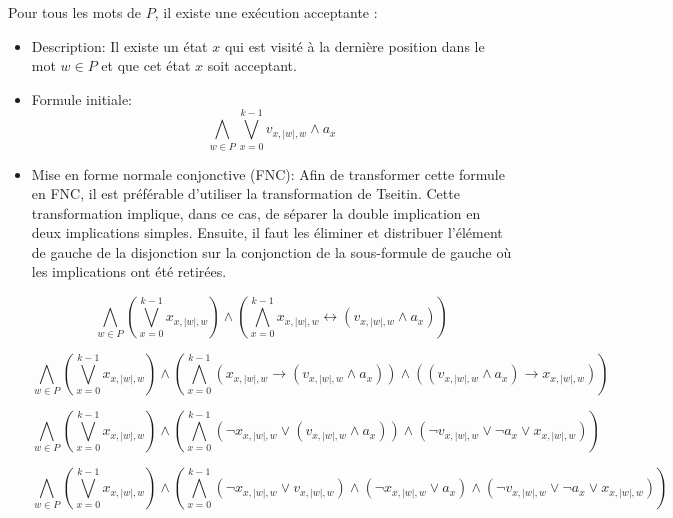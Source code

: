 \begin{tcolorbox}[defaultstyle,title=Contrainte 2]
    \label{contrainte 2}
    Pour tous les mots de $P$, il existe une exécution acceptante :
    
    \begin{itemize}
        \item Description: Il existe un état \(x\) qui est visité à la dernière position dans le mot \( w \in P \) et que cet état \(x\) soit acceptant.\\

        \item Formule initiale:
        \[ \bigwedge\limits_{w \in P}\bigvee\limits_{x=0}^{k-1} v_{x, |w|, w} \land a_{x} \]
        
        \item Mise en forme normale conjonctive (FNC): Afin de transformer cette formule en FNC, il est préférable d'utiliser la transformation de Tseitin. Cette transformation implique, dans ce cas, de séparer la double implication en deux implications simples. Ensuite, il faut les éliminer et distribuer l'élément de gauche de la disjonction sur la conjonction de la sous-formule de gauche où les implications ont été retirées.

        \[\bigwedge\limits_{w \in P} \left(\bigvee\limits_{x=0}^{k-1} x_{x, |w|, w} \right)\land \left(\bigwedge\limits_{x=0}^{k-1} x_{x, |w|, w} \leftrightarrow (v_{x, |w|, w} \land a_{x}) \right) \]

        \[ \bigwedge\limits_{w \in P} \left(\bigvee\limits_{x=0}^{k-1} x_{x, |w|, w} \right)\land \left(\bigwedge\limits_{x=0}^{k-1} \left(x_{x, |w|, w} \rightarrow (v_{x, |w|, w} \land a_{x}) \right) \land \left( (v_{x, |w|, w} \land a_{x}) \rightarrow x_{x, |w|, w}\right) \right) \]

        \[ \bigwedge\limits_{w \in P} \left(\bigvee\limits_{x=0}^{k-1} x_{x, |w|, w} \right)\land \left(\bigwedge\limits_{x=0}^{k-1} \left(\lnot x_{x, |w|, w} \lor (v_{x, |w|, w} \land a_{x}) \right) \land \left( \lnot v_{x, |w|, w} \lor \lnot a_{x} \lor x_{x, |w|, w}\right) \right) \]

        \[ \bigwedge\limits_{w \in P} \left(\bigvee\limits_{x=0}^{k-1} x_{x, |w|, w} \right)\land \left(\bigwedge\limits_{x=0}^{k-1} (\lnot x_{x, |w|, w} \lor v_{x, |w|, w}) \land (\lnot x_{x, |w|, w} \lor a_{x}) \land \left( \lnot v_{x, |w|, w} \lor \lnot a_{x} \lor x_{x, |w|, w}\right) \right) \]


        
    \end{itemize}

\end{tcolorbox}
            
